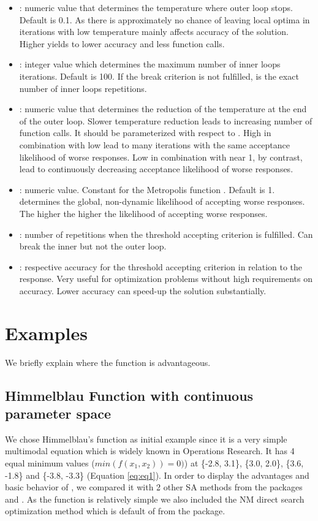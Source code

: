 \begin{itemize}
	\item {}: numeric value that determines the temperature where outer loop stops. Default is 0.1. As there is approximately no chance of leaving local optima in iterations with low temperature  mainly affects accuracy of the solution. Higher  yields to lower accuracy and less function calls.
	\item {}: integer value which determines the maximum number of inner loops iterations. Default is 100. If the break criterion  is not fulfilled,  is the exact number of inner loops repetitions.
	\item {}: numeric value that determines the reduction of the temperature at the end of the outer loop. Slower temperature reduction leads to increasing number of function calls. It should be parameterized with respect to . High  in combination with low  lead to many iterations with the same acceptance likelihood of worse responses. Low  in combination with  near 1, by contrast, lead to continuously decreasing acceptance likelihood of worse responses.
	\item {}: numeric value. Constant for the Metropolis function \citep{kirkpatrick_1983}. Default is 1.  determines the global, non-dynamic likelihood of accepting worse responses. The higher  the higher the likelihood of accepting worse responses.
	\item {}: number of repetitions when the threshold accepting criterion is fulfilled. Can break the inner but not the outer loop.
	\item {}: respective accuracy for the threshold accepting criterion in relation to the response. Very useful for optimization problems without high requirements on accuracy. Lower accuracy can speed-up the solution substantially.
\end{itemize}

\section{Examples}
We briefly explain where the  function is advantageous.

\subsection{Himmelblau Function with continuous parameter space}
We chose Himmelblau's function \citep{himmelblau_1972} as initial example since it is a very simple multimodal equation which is widely known in Operations Research. It has 4 equal minimum values ($min(f(x_1,x_2))=0)$) at \{-2.8, 3.1\}, \{3.0, 2.0\}, \{3.6, -1.8\} and \{-3.8, -3.3\} (Equation \ref{eq:eq1}). In order to display the advantages and basic behavior of , we compared it with 2 other SA methods from the packages  and . As the function is relatively simple we also included the NM direct search optimization method \citep{nelder_1965} which is default of  from the  package.

